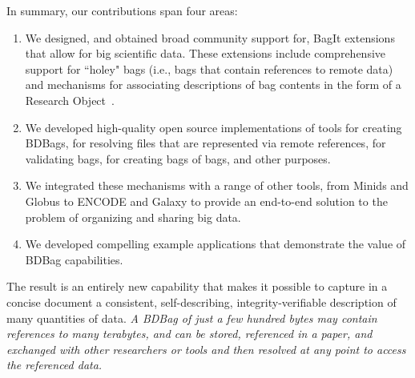\documentclass[11pt]{article}
\begin{document}
In summary, our contributions span four areas:
\begin{enumerate}
\item
We designed, and obtained broad community support for, BagIt extensions that allow for big scientific data.
These extensions include comprehensive support for
``holey" bags (i.e., bags that contain references to remote data)
and mechanisms for associating descriptions of bag contents in the form of a Research Object~\cite{bechhofer2013linked}.

\item
We developed high-quality open source implementations of tools for creating BDBags,
for resolving files that are represented via remote references, for validating
bags, for creating bags of bags, and other purposes.

\item
We integrated these mechanisms with a range of other tools, 
from Minids and Globus to ENCODE and Galaxy 
to provide an end-to-end solution to the problem of organizing and sharing big data. 

\item
We developed compelling example applications that demonstrate the value of BDBag capabilities.

\end{enumerate}


The result is an entirely new capability that makes it possible to
capture in a concise document a consistent, self-describing, integrity-verifiable description of many quantities of data.
\emph{A BDBag of just a few hundred bytes may contain references to many terabytes, and 
can be stored, referenced in a paper, and exchanged with other researchers or tools
and then resolved at any point to access the referenced data.}


\end{document}
